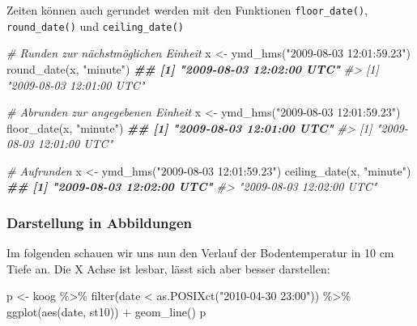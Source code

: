 \documentclass[
]{article}
\newenvironment{Shaded}{\begin{snugshade}}{\end{snugshade}}
\newcommand{\CommentTok}[1]{\textcolor[rgb]{0.56,0.35,0.01}{\textit{#1}}}
\newcommand{\DocumentationTok}[1]{\textcolor[rgb]{0.56,0.35,0.01}{\textbf{\textit{#1}}}}
\newcommand{\FunctionTok}[1]{\textcolor[rgb]{0.00,0.00,0.00}{#1}}
\newcommand{\NormalTok}[1]{#1}
\newcommand{\OtherTok}[1]{\textcolor[rgb]{0.56,0.35,0.01}{#1}}
\newcommand{\SpecialCharTok}[1]{\textcolor[rgb]{0.00,0.00,0.00}{#1}}
\newcommand{\StringTok}[1]{\textcolor[rgb]{0.31,0.60,0.02}{#1}}
\begin{document}
Zeiten können auch gerundet werden mit den Funktionen \texttt{floor\_date()}, \texttt{round\_date()} und \texttt{ceiling\_date()}

\begin{Shaded}
\begin{Highlighting}[]
\CommentTok{\# Runden zur nächstmöglichen Einheit}
\NormalTok{x }\OtherTok{\textless{}{-}} \FunctionTok{ymd\_hms}\NormalTok{(}\StringTok{"2009{-}08{-}03 12:01:59.23"}\NormalTok{)}
\FunctionTok{round\_date}\NormalTok{(x, }\StringTok{"minute"}\NormalTok{)}
\DocumentationTok{\#\# [1] "2009{-}08{-}03 12:02:00 UTC"}
\CommentTok{\#\textgreater{} [1] "2009{-}08{-}03 12:01:00 UTC"}

\CommentTok{\# Abrunden zur angegebenen Einheit}
\NormalTok{x }\OtherTok{\textless{}{-}} \FunctionTok{ymd\_hms}\NormalTok{(}\StringTok{"2009{-}08{-}03 12:01:59.23"}\NormalTok{)}
\FunctionTok{floor\_date}\NormalTok{(x, }\StringTok{"minute"}\NormalTok{)}
\DocumentationTok{\#\# [1] "2009{-}08{-}03 12:01:00 UTC"}
\CommentTok{\#\textgreater{} [1] "2009{-}08{-}03 12:01:00 UTC"}

\CommentTok{\# Aufrunden }
\NormalTok{x }\OtherTok{\textless{}{-}} \FunctionTok{ymd\_hms}\NormalTok{(}\StringTok{"2009{-}08{-}03 12:01:59.23"}\NormalTok{)}
\FunctionTok{ceiling\_date}\NormalTok{(x, }\StringTok{"minute"}\NormalTok{)}
\DocumentationTok{\#\# [1] "2009{-}08{-}03 12:02:00 UTC"}
\CommentTok{\#\textgreater{} "2009{-}08{-}03 12:02:00 UTC"}
\end{Highlighting}
\end{Shaded}

\hypertarget{darstellung-in-abbildungen}{%
\subsubsection{Darstellung in Abbildungen}\label{darstellung-in-abbildungen}}

Im folgenden schauen wir uns nun den Verlauf der Bodentemperatur in 10 cm Tiefe an. Die X Achse ist lesbar, lässt sich aber besser darstellen:

\begin{Shaded}
\begin{Highlighting}[]
\NormalTok{p }\OtherTok{\textless{}{-}}\NormalTok{ koog }\SpecialCharTok{\%\textgreater{}\%}
  \FunctionTok{filter}\NormalTok{(date }\SpecialCharTok{\textless{}} \FunctionTok{as.POSIXct}\NormalTok{(}\StringTok{"2010{-}04{-}30 23:00"}\NormalTok{)) }\SpecialCharTok{\%\textgreater{}\%}
  \FunctionTok{ggplot}\NormalTok{(}\FunctionTok{aes}\NormalTok{(date, st10)) }\SpecialCharTok{+}
  \FunctionTok{geom\_line}\NormalTok{()}
\NormalTok{p}
\end{Highlighting}
\end{Shaded}
\end{document}

